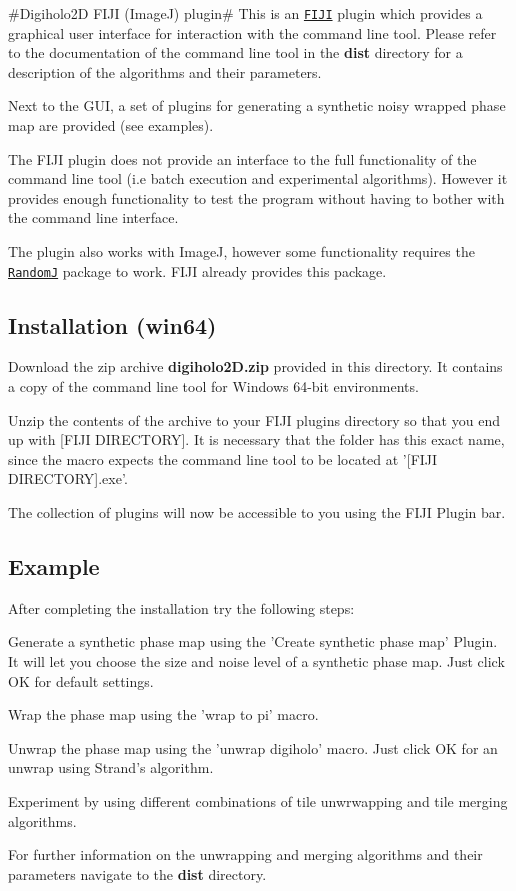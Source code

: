 \#\-Digiholo2\-D F\-I\-J\-I (Image\-J) plugin\# This is an \href{http://fiji.sc/Fiji}{\tt F\-I\-J\-I} plugin which provides a graphical user interface for interaction with the command line tool. Please refer to the documentation of the command line tool in the {\bfseries dist} directory for a description of the algorithms and their parameters.

Next to the G\-U\-I, a set of plugins for generating a synthetic noisy wrapped phase map are provided (see examples).

The F\-I\-J\-I plugin does not provide an interface to the full functionality of the command line tool (i.\-e batch execution and experimental algorithms). However it provides enough functionality to test the program without having to bother with the command line interface.

The plugin also works with Image\-J, however some functionality requires the \href{http://www.imagescience.org/meijering/software/randomj/}{\tt Random\-J} package to work. F\-I\-J\-I already provides this package.

\subsection*{Installation (win64)}


\begin{DoxyEnumerate}
\item Download the zip archive {\bfseries digiholo2\-D.\-zip} provided in this directory. It contains a copy of the command line tool for Windows 64-\/bit environments.
\item Unzip the contents of the archive to your F\-I\-J\-I plugins directory so that you end up with \mbox{[}F\-I\-J\-I D\-I\-R\-E\-C\-T\-O\-R\-Y\mbox{]}. It is necessary that the folder has this exact name, since the macro expects the command line tool to be located at '\mbox{[}F\-I\-J\-I D\-I\-R\-E\-C\-T\-O\-R\-Y\mbox{]}.exe'.
\item The collection of plugins will now be accessible to you using the F\-I\-J\-I Plugin bar.
\end{DoxyEnumerate}

\subsection*{Example}

After completing the installation try the following steps\-:


\begin{DoxyEnumerate}
\item Generate a synthetic phase map using the 'Create synthetic phase map' Plugin. It will let you choose the size and noise level of a synthetic phase map. Just click O\-K for default settings.
\item Wrap the phase map using the 'wrap to pi' macro.
\item Unwrap the phase map using the 'unwrap digiholo' macro. Just click O\-K for an unwrap using Strand's algorithm.
\item Experiment by using different combinations of tile unwrwapping and tile merging algorithms.
\end{DoxyEnumerate}

For further information on the unwrapping and merging algorithms and their parameters navigate to the {\bfseries dist} directory. 